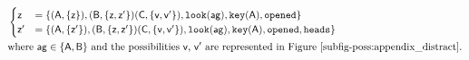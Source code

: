 $\begin{aligned}
&\begin{cases}
\poss{z} &= \bra{
	(\agent{A},\bra{\poss{z}}), (\agent{B}, \bra{\poss{z}, \poss{z^\prime}}) (\agent{C}, \bra{\poss{v}, \poss{v^\prime}}),
	\looking{ag},
	\haskey{a},
	\opened}\\
\poss{z^\prime} &= \bra{
	(\agent{A},\bra{\poss{z^\prime}}), (\agent{B}, \bra{\poss{z}, \poss{z^\prime}}) (\agent{C}, \bra{\poss{v}, \poss{v^\prime}}),
	\looking{ag},
	\haskey{a},
	\opened,
	\head}
\end{cases}\\
&\text{where }\agent{ag} \in \bra{\agent{a}, \agent{b}} \text{ and the \posS\ \poss{v}, \poss{v^\prime} are represented in Figure~\ref{subfig-poss:appendix_distract}.}
\end{aligned}$


